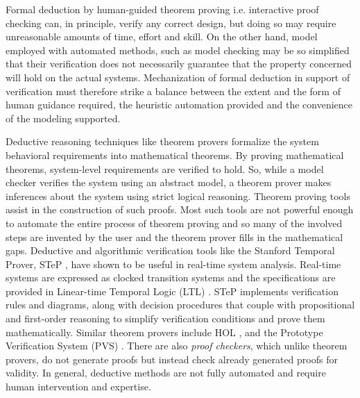 Formal deduction by human-guided theorem proving i.e. interactive proof checking can, in principle, verify any correct design, but doing so may require unreasonable amounts of time, effort and skill. On the other hand, model employed with automated methods, such as model checking may be so simplified that their verification does not necessarily guarantee that the property concerned will hold on the actual systems. Mechanization of formal deduction in support of verification must therefore strike a balance between the extent and the form of human guidance required, the heuristic automation provided and the convenience of the modeling supported. 


Deductive reasoning techniques like theorem provers formalize the system behavioral requirements into mathematical theorems. By proving mathematical theorems, system-level requirements are verified to hold. So, while a model checker verifies the system using an abstract model, a theorem prover makes inferences about the system using strict logical reasoning. Theorem proving tools assist in the construction of such proofs. Most such tools are not powerful enough to automate the entire process of theorem proving and so many of the involved steps are invented by the user and the theorem prover fills in the mathematical gaps. Deductive and algorithmic verification tools like the Stanford Temporal Prover, STeP \cite{bjorner2001deductive}, have shown to be useful in real-time system analysis. Real-time systems are expressed as clocked transition systems and the specifications are provided in Linear-time Temporal Logic (LTL) \cite{gabbay1994temporal}. STeP implements verification rules and diagrams, along with decision procedures that couple with propositional and first-order reasoning to simplify verification conditions and prove them mathematically. Similar theorem provers include HOL \cite{gordon1993introduction}, and the Prototype Verification System (PVS) \cite{owre1992pvs}. There are also \emph{proof checkers}, which unlike theorem provers, do not generate proofs but instead check already generated proofs for validity. In general, deductive methods are not fully automated and require human intervention and expertise. 

